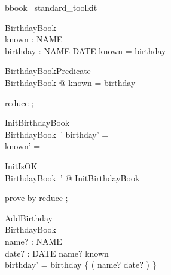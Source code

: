\begin{zsection}	 \SECTION bbook \parents~standard\_toolkit
\end{zsection}



\begin{zed}
\end{zed}



\begin{schema}{BirthdayBook}
\\
 known : \power NAME \\
 birthday : NAME \pfun DATE 
\where
 known = \dom birthday
\end{schema}



\begin{theorem}{ BirthdayBookPredicate}\\
 \forall BirthdayBook @ known = \dom birthday \\

\end{theorem}



\begin{zproof}[BirthdayBookPredicate]

 reduce ;
 

\end{zproof}



\begin{schema}{InitBirthdayBook}
\\
 BirthdayBook~' 
\where
 birthday' =~\emptyset \\
 known' =~\emptyset
\end{schema}



\begin{theorem}{ InitIsOK}\\
 \exists BirthdayBook~' @ InitBirthdayBook \\

\end{theorem}



\begin{zproof}[InitIsOK]

 prove by reduce ;
 

\end{zproof}



\begin{schema}{AddBirthday}
\\
 \Delta BirthdayBook \\
 name? : NAME \\
 date? : DATE 
\where
 name? \notin known \\
 birthday' = birthday \cup \{ ( name? \mapsto date? ) \}
\end{schema}



